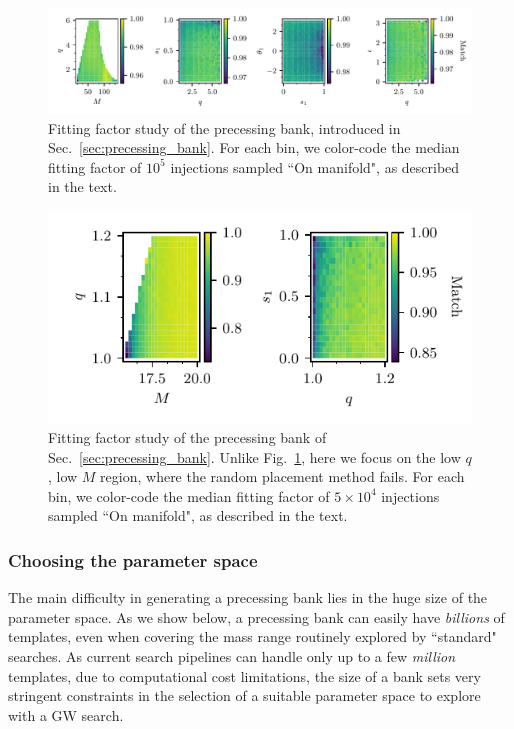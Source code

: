 \documentclass[twocolumn,showpacs,preprintnumbers,nofootinbib,prd,
superscriptaddress,10pt]{revtex4-2}
\begin{document}
\begin{figure}[t]
		\includegraphics[scale = 1.]{precessing_injections}
		\caption{Fitting factor study of the precessing bank, introduced in Sec.~\ref{sec:precessing_bank}. For each bin, we color-code the median fitting factor of $10^5$ injections sampled ``On manifold", as described in the text.}
		\label{fig:precessing_fitting_factor}
\end{figure}

\begin{figure}[t]
	\centering
	\includegraphics[scale = 1.]{precessing_injections_lowM}
	\caption{Fitting factor study of the precessing bank of Sec.~\ref{sec:precessing_bank}. Unlike Fig.~\ref{fig:precessing_fitting_factor}, here we focus on the low $q$, low $M$ region, where the random placement method fails. For each bin, we color-code the median fitting factor of $5 \times 10^4$ injections sampled ``On manifold", as described in the text.}
	\label{fig:precessing_fitting_factor_zoom}
\end{figure}

\subsubsection{Choosing the parameter space}

The main difficulty in generating a precessing bank lies in the huge size of the parameter space. As we show below, a precessing bank can easily have {\it billions} of templates, even when covering the mass range routinely explored by ``standard" searches. As current search pipelines can handle only up to a few {\it million} templates, due to computational cost limitations, the size of a bank sets very stringent constraints in the selection of a suitable parameter space to explore with a GW search.
\end{document}
